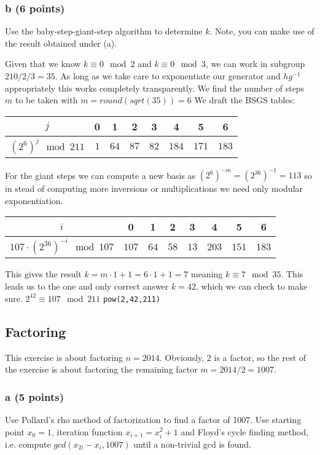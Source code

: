 \documentclass{article}
\begin{document}
\subsubsection{b (6 points)}
Use the baby-step-giant-step algorithm to determine $k$.
Note, you can make use of the result obtained
under (a).

Given that we know $k \equiv 0 \mod 2$ and $k \equiv 0 \mod 3$, we can work in
subgroup $210/2/3=35$.
As long as we take care to exponentiate our generator and
$hg^{-1}$ appropriately this works completely transparently.
We find the number of steps $m$ to be taken with $m = round(sqrt(35)) = 6$
We draft the BSGS tables:

\begin{tabular}{|c|c|c|c|c|c|c|c|}
\hline
$j $ & 0 & 1 & 2 & 3 & 4 & 5 & 6  \\
\hline
$(2^6)^j \mod 211$ & $1$ & $64$ & $87$ & $82$ & $184$ & $171$ & $183$ \\
\hline
\end{tabular}

For the giant steps we can compute a new basis as $(2^6)^{-m} = (2^{36})^{-1} =
113$
so in stead of computing more inversions or multiplications we need only modular exponentiation.

\begin{tabular}{|c|c|c|c|c|c|c|c|}
\hline
$i $ & 0 & 1 & 2 & 3 & 4 & 5 & 6  \\
\hline
$107 \cdot (2^{36})^{-i} \mod 107$ & $107$ & $64$ & $58$ & $13$ & $203$ & $151$ & $183$ \\
\hline
\end{tabular}

This gives the result $k=m \cdot 1 + 1 = 6 \cdot 1 + 1 = 7$ meaning $k \equiv 7
\mod 35$.
This leads us to the one and only correct answer $k=42$, which we can check to
make sure.
$2^{42} \equiv 107 \mod 211$
\verb|pow(2,42,211)|

\subsection{Factoring}
This exercise is about factoring $n = 2014$. Obviously, 2 is a factor, so
the rest of the exercise is about factoring the remaining factor $m = 2014/2 =
1007$.

\subsubsection{a (5 points)}
Use Pollard’s rho method of factorization to find a factor of 1007.
Use starting point $x_0 = 1$, iteration function $x_{i+1} = x_i^2 + 1$ and
Floyd's cycle finding method, i.e. compute $gcd(x_{2i} - x_i , 1007)$ until
a non-trivial gcd is found.
\end{document}
